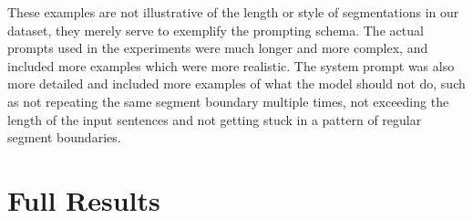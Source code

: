These examples are not illustrative of the length or style of segmentations in our dataset, they merely serve to exemplify the prompting schema. The actual prompts used in the experiments were much longer and more complex, and included more examples which were more realistic. The system prompt was also more detailed and included more examples of what the model should not do, such as not repeating the same segment boundary multiple times, not exceeding the length of the input sentences and not getting stuck in a pattern of regular segment boundaries.

\section{Full Results}\label{Full Results}

